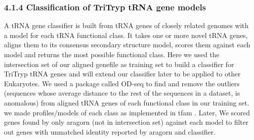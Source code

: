 \documentclass[
12pt, %
a4paper, %
oneside, %
headinclude,footinclude, %
BCOR5mm, %
]{scrartcl}
\begin{document}
\subsubsection*{4.1.4 Classification of TriTryp tRNA gene models}
A tRNA gene classifier is built from tRNA genes of closely related genomes with a model for each tRNA functional class. It takes one or more novel tRNA genes, aligns them to its consensus secondary structure model, scores them against each model and returns the most possible functional class. Here we used the intersection set of our aligned genefile as training set to build a classifier for TriTryp tRNA genes and will extend our classifier later to be applied to other Eukaryotes. We used a package called OD-seq \cite{ODseq} to find and remove the outliers (sequences whose average distance to the rest of the sequences in a dataset, is anomalous) from aligned tRNA genes of each functional class in our training set. we made profiles/models of each class as implemented in tfam \cite{Ardell2006TFAMDC}. Later, We scored genes found by only aragorn (not in intersection set) against each model to filter out genes with unmatched identity reported by aragorn and classifier.
\end{document}
